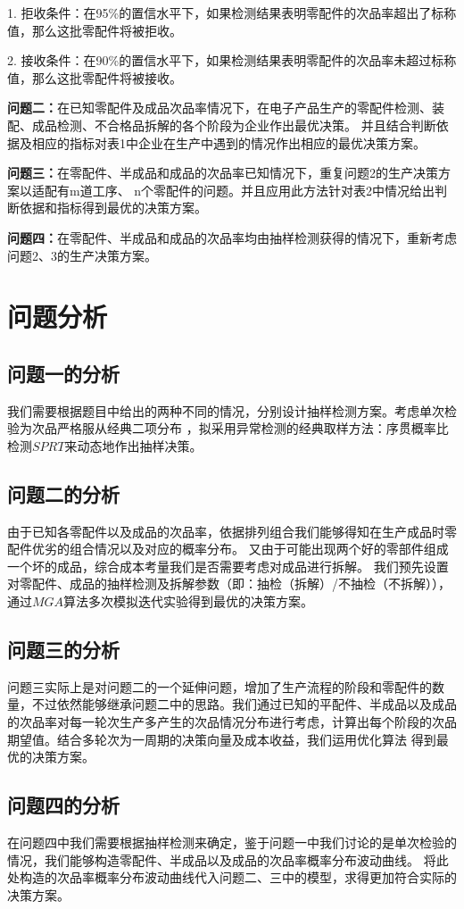 \documentclass[withoutpreface,bwprint]{cumcmthesis} %
\begin{document}
1. 拒收条件：在95\%的置信水平下，如果检测结果表明零配件的次品率超出了标称值，那么这批零配件将被拒收。

2. 接收条件：在90\%的置信水平下，如果检测结果表明零配件的次品率未超过标称值，那么这批零配件将被接收。

\textbf{问题二：}在已知零配件及成品次品率情况下，在电子产品生产的零配件检测、装配、成品检测、不合格品拆解的各个阶段为企业作出最优决策。
并且结合判断依据及相应的指标对表1中企业在生产中遇到的情况作出相应的最优决策方案。

\textbf{问题三：}在零配件、半成品和成品的次品率已知情况下，重复问题2的生产决策方案以适配有m道工序、
n个零配件的问题。并且应用此方法针对表2中情况给出判断依据和指标得到最优的决策方案。

\textbf{问题四：}在零配件、半成品和成品的次品率均由抽样检测获得的情况下，重新考虑问题2、3的生产决策方案。
\section{问题分析}
\subsection{问题一的分析}
我们需要根据题目中给出的两种不同的情况，分别设计抽样检测方案。考虑单次检验为次品严格服从经典二项分布
，拟采用异常检测的经典取样方法：序贯概率比检测$SPRT$来动态地作出抽样决策。

\subsection{问题二的分析}
由于已知各零配件以及成品的次品率，依据排列组合我们能够得知在生产成品时零配件优劣的组合情况以及对应的概率分布。
又由于可能出现两个好的零部件组成一个坏的成品，综合成本考量我们是否需要考虑对成品进行拆解。
我们预先设置对零配件、成品的抽样检测及拆解参数（即：抽检（拆解）/不抽检（不拆解）），通过$MGA$算法多次模拟迭代实验得到最优的决策方案。
\subsection{问题三的分析}
问题三实际上是对问题二的一个延伸问题，增加了生产流程的阶段和零配件的数量，不过依然能够继承问题二中的思路。我们通过已知的平配件、半成品以及成品
的次品率对每一轮次生产多产生的次品情况分布进行考虑，计算出每个阶段的次品期望值。结合多轮次为一周期的决策向量及成本收益，我们运用优化算法
得到最优的决策方案。
\subsection{问题四的分析}
在问题四中我们需要根据抽样检测来确定，鉴于问题一中我们讨论的是单次检验的情况，我们能够构造零配件、半成品以及成品的次品率概率分布波动曲线。
将此处构造的次品率概率分布波动曲线代入问题二、三中的模型，求得更加符合实际的决策方案。
\end{document}
